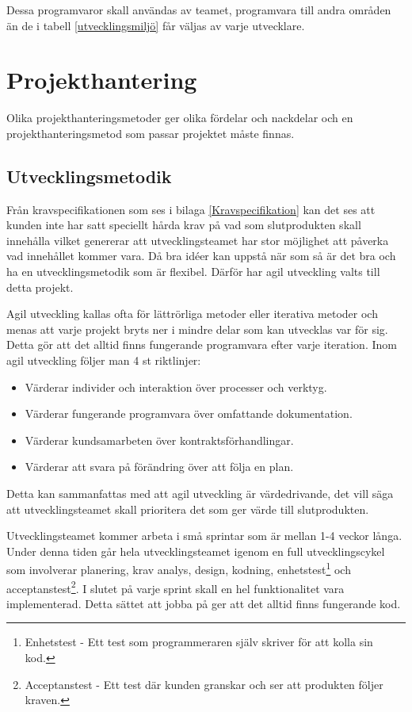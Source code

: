 \documentclass[a4paper,12pt,oneside,final]{extbook}
\begin{document}
Dessa programvaror skall användas av teamet, programvara till andra områden än de i tabell \ref{utvecklingsmiljö} får väljas av varje utvecklare.
	



\chapter{Projekthantering}

Olika projekthanteringsmetoder ger olika fördelar och nackdelar och en projekthanteringsmetod som passar projektet måste finnas.

\section{Utvecklingsmetodik}
Från kravspecifikationen som ses i bilaga \ref{Kravspecifikation} kan det ses att kunden inte har satt speciellt hårda krav på vad som slutprodukten skall innehålla vilket genererar att utvecklingsteamet har stor möjlighet att påverka vad innehållet kommer vara. Då bra idéer kan uppstå när som så är det bra och ha en utvecklingsmetodik som är flexibel. Därför har agil utveckling valts till detta projekt.

Agil utveckling kallas ofta för lättrörliga metoder eller iterativa metoder och menas att varje projekt bryts ner i mindre delar som kan utvecklas var för sig. Detta gör att det alltid finns fungerande programvara efter varje iteration. Inom agil utveckling följer man 4 st riktlinjer\cite{Sewell2012asd}:

\begin{itemize}
	\item Värderar individer och interaktion över processer och verktyg.
	\item Värderar fungerande programvara över omfattande dokumentation.
	\item Värderar kundsamarbeten över kontraktsförhandlingar.
	\item Värderar att svara på förändring över att följa en plan.
\end{itemize}
Detta kan sammanfattas med att agil utveckling är värdedrivande, det vill säga att utvecklingsteamet skall prioritera det som ger värde till slutprodukten.

Utvecklingsteamet kommer arbeta i små sprintar som är mellan 1-4 veckor långa. Under denna tiden går hela utvecklingsteamet igenom en full utvecklingscykel som involverar planering, krav analys, design, kodning, enhetstest\footnote{Enhetstest - Ett test som programmeraren själv skriver för att kolla sin kod.} och acceptanstest\footnote{Acceptanstest - Ett test där kunden granskar och ser att produkten följer kraven. }\cite{Sewell2012asd}. I slutet på varje sprint skall en hel funktionalitet vara implementerad. Detta sättet att jobba på ger att det alltid finns fungerande kod. 
\end{document}
